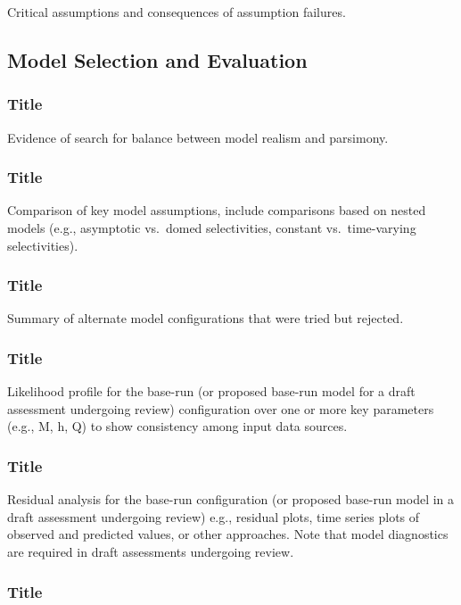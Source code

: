 \documentclass[12pt,]{article}
\begin{document}
Critical assumptions and consequences of assumption failures.

\subsection{Model Selection and
Evaluation}\label{model-selection-and-evaluation}

\subsubsection{Title}\label{title-15}

Evidence of search for balance between model realism and parsimony.

\subsubsection{Title}\label{title-16}

Comparison of key model assumptions, include comparisons based on nested
models (e.g., asymptotic vs.~domed selectivities, constant
vs.~time-varying selectivities).

\subsubsection{Title}\label{title-17}

Summary of alternate model configurations that were tried but rejected.

\subsubsection{Title}\label{title-18}

Likelihood profile for the base-run (or proposed base-run model for a
draft assessment undergoing review) configuration over one or more key
parameters (e.g., M, h, Q) to show consistency among input data sources.

\subsubsection{Title}\label{title-19}

Residual analysis for the base-run configuration (or proposed base-run
model in a draft assessment undergoing review) e.g., residual plots,
time series plots of observed and predicted values, or other approaches.
Note that model diagnostics are required in draft assessments undergoing
review.

\subsubsection{Title}\label{title-20}
\end{document}
